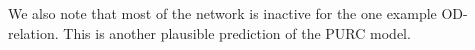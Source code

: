 \documentclass[a4paper,11pt]{article}
\begin{document}
We also note that most of the network is inactive for the one example OD-relation. This is another plausible prediction of the PURC model.

\end{document}
